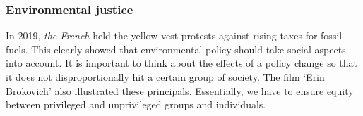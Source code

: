 \documentclass[../summary.tex]{subfiles}
\begin{document}
		\subsubsection{Environmental justice}
			In 2019, \emph{the French} held the yellow vest protests against rising taxes for fossil fuels. This clearly showed that environmental policy should take social aspects into account. It is important to think about the effects of a policy change so that it does not disproportionally hit a certain group of society. The film `Erin Brokovich' also illustrated these principals. Essentially, we have to ensure equity between privileged and unprivileged groups and individuals. 
		
		
\end{document}
